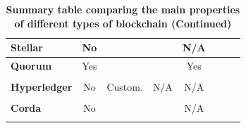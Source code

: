 \begin{table}
\begin{centering}
{\begin{tabular}{| l | c | c | c | c | c | c | c |}
\textbf{Stellar}		&No			&			&
				&N/A			&			&				&\\
\hline
\textbf{Quorum} 	&Yes			&			&
				&Yes			&			&				&\\
			 	&			&			&
				& 			&			&				& \\
\hline
\textbf{Hyperledger}	&No			&Custom.		&N/A
				&N/A			&			&				&\\
 				&			&			&
				&			&			&				& \\
\hline
\textbf{Corda} 		&No			&			&
				&N/A			&			&				& \\
		 		&			&			&
				& 			&			&				& \\
\hline
\end{tabular}}
\caption{\bf \small Summary table comparing the main properties of different types of blockchain (Continued)}
\label{blockchain_types2}
\end{centering}
\end{table}








